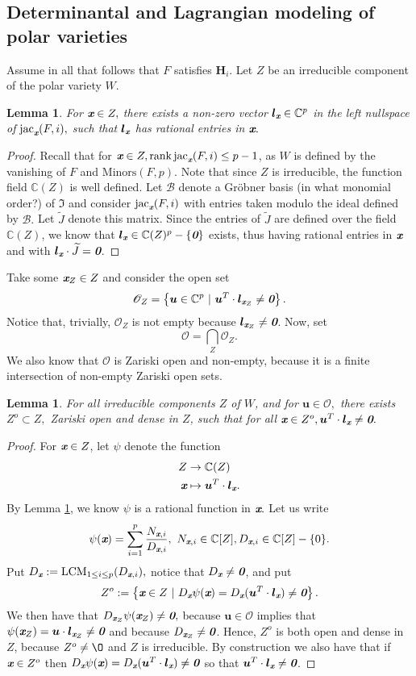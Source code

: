 \documentclass[a4paper]{article}
\def\bz{\textit{\textbf{0}}}
\def\ub{{\bm u}}
\def\lb{{\bm l}}
\def\xb{\textit{\textbf{x}}}
\def\jt{\widetilde{J}}
\DeclareMathOperator{\LCM}{LCM}
\DeclareMathOperator{\jac}{jac}
\DeclareMathOperator{\rk}{rank}
\def\minors{\textrm{Minors}(F,p)}
\def\C{\mathbb{C}}
\def\I{\mathfrak{I}}
\def\ji{\jac_{\xb}(F,i)}
\newtheorem{lemma}[theorem]{Lemma}
\begin{document}
\subsection{Determinantal and Lagrangian modeling of polar varieties}
%
Assume in all that follows that $F$ satisfies $\bm H_i$. Let $Z$ be an irreducible component of the polar variety $W$.  
%
\begin{lemma}\label{lem:3.7}
For $\xb \in Z,$ there exists a non-zero vector $\lb_{\xb}\in \C^p$ in the left nullspace of $\ji,$ such that $\lb_{\xb}$ has rational entries in $\xb.$
\end{lemma}
%
\begin{proof}
Recall that for $\xb \in Z, \rk \ji \leq p-1$, as $W$ is defined by the vanishing of $F$ and $\minors$. Note that since $Z$ is irreducible, the function field $\C(Z)$ is well defined. Let $\mathscr{B}$ denote a Gr\"obner basis (in what monomial order?) of $\I$ and consider $\jac_{\xb}(F,i)$  with entries taken modulo the ideal defined by $\mathscr{B}.$ Let $\jt$ denote this matrix. Since the entries of $\jt$ are defined over the field $\C(Z)$, we know that  $\lb_{\xb} \in \C(Z)^p-\{\bz\}$ exists, thus having rational entries in $\xb$ and with $\lb_{\xb} \cdot \jt = \bz$. 
\end{proof}
%
\noindent
Take some $\xb_Z \in Z$ and consider the open set
\[
\mathscr{O}_{Z} = 
\left\{\ub \in \C^p~|~\ub^T\cdot \lb_{\xb_Z} \not = \textit{\textbf{0}}\right\}.
\]
Notice that, trivially, $\mathscr{O}_Z$ is not empty because $\lb_{\xb_Z} \not = \bz$. Now, set
\[
\mathscr{O} = 
\bigcap_Z \mathscr{O}_{Z}.
\]
We also know that $\mathscr{O}$ is Zariski open and non-empty, because it is a finite intersection of non-empty Zariski open sets.
%
\begin{lemma}\label{lem:3.8}
For all irreducible components $Z$ of $W$, and for $\ub \in \mathscr{O},$ there exists $Z^o \subset Z,$ Zariski open and dense in $Z$, such that for all $\xb \in Z^o, \ub^T\cdot \lb_{\xb} \not = \bz.$
\end{lemma}
%
\begin{proof}
For $\xb \in Z$, let $\psi$ denote the function 
\begin{align*}
Z  &\rightarrow \C(Z)\\    
    \xb &\mapsto \ub^T \cdot \lb_{\xb}.    
\end{align*}
 By Lemma \ref{lem:3.7}, we know $\psi$ is a rational function in $\xb.$ Let us write 
\[
\psi(\xb) = \sum_{i=1}^p\frac{N_{\xb,i}}{D_{\xb,i}},~N_{\xb,i} \in \C[Z], D_{\xb,i} \in \C[Z]-\{0\}. 
\]
Put $D_{\xb} := \LCM_{1\leq i \leq p}(D_{\xb,i}),$ notice that $D_{\xb} \not = \bz$, and put  
\[
Z^o := \left\{\xb \in Z~|~D_{\xb}\psi(\xb) = D_{\xb}(\ub^T \cdot \lb_{\xb})\not = \bz\right\}.
\]
We then have that $D_{\xb_Z}\psi(\xb_Z) \not = \bz,$
because $\ub \in \mathscr{O}$ implies that $\psi(\xb_Z)= \ub \cdot \lb_{\xb_Z} \not = \bz$ and because $D_{\xb_Z} \not = \bz$.  Hence, $Z^o$ is both open and dense in $Z$, because $Z^o \not = \O$ and $Z$ is irreducible. By construction we also have that if $\xb \in Z^o$ then $D_{\xb}\psi(\xb) = D_{\xb}(\ub^T \cdot \lb_{\xb})\not = \bz$ so that $\ub^T \cdot \lb_{\xb}\not = \bz$.
\end{proof}
\end{document}
